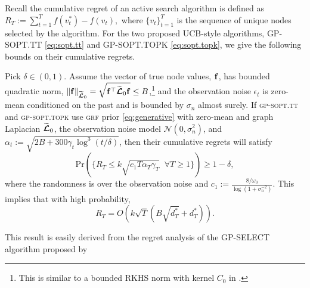 Recall the cumulative regret of an active search algorithm is defined as
$ %
	R_T := \sum_{t=1}^T f(v^*_t) - f(v_t), 
$ %
where $\{v_t\}_{t=1}^T$ is the sequence of unique nodes selected by the algorithm.
For the two proposed UCB-style algorithms, GP-SOPT.TT \eqref{eq:sopt.tt} and GP-SOPT.TOPK \eqref{eq:sopt.topk}, we give the following 
bounds on their cumulative regrets.
\begin{theorem}
\label{thm:as_regret}
Pick $\delta \in (0,1)$. 
Assume the vector of true node values, $\mathbf{f}$, has bounded quadratic norm, $\|\mathbf{f}\|_{\widetilde{{\boldsymbol{\mathcal L}}}_0} = \sqrt{\mathbf{f}^\top \widetilde{{\boldsymbol{\mathcal L}}}_0 \mathbf{f}}\leq B$,\footnote{This is similar to a bounded RKHS norm with kernel $C_0$ in \cite{srinivas2012information}.}
and the observation noise $\epsilon_t$ is zero-mean conditioned on the past and is bounded by $\sigma_n$ almost surely. 
If \textsc{gp-sopt.tt} and \textsc{gp-sopt.topk} 
use \textsc{grf} prior \eqref{eq:generative} with zero-mean and graph Laplacian $\widetilde{{\boldsymbol{\mathcal L}}}_0$, 
the observation noise model $\mathcal{N}(0,\sigma_n^2)$, and 
$\alpha_t := \sqrt{2 B + 300 \gamma_t \log^3(t / \delta)}$, then their cumulative regrets will satisfy
\begin{equation*}
	\mbox{Pr}(\{R_T \leq k \sqrt{c_1 T \alpha_T \gamma_T}\;\; \forall T \geq 1\}) \geq 1 - \delta,
\end{equation*}
where the randomness is over the observation noise and $c_1 := \frac{8/\omega_0}{\log(1 + \sigma_n^{-2})}$. This implies that with high probability,
\begin{equation*}
R_T = O(k\sqrt{T}(B \sqrt{d^*_T} + d^*_T)).
\end{equation*}
\end{theorem}
This result is easily derived from the regret analysis of the GP-SELECT algorithm proposed by \cite{vanchinathanadaptively}
